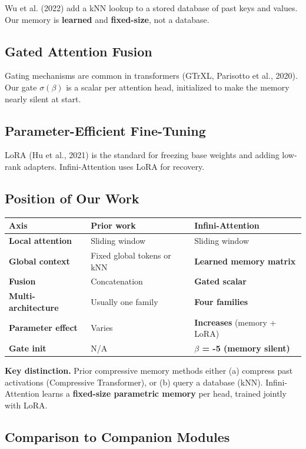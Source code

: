 Wu et al. (2022) add a kNN lookup to a stored database of past keys and 
values. Our memory is \textbf{learned} and \textbf{fixed-size}, not a database.

\subsection{Gated Attention Fusion}

Gating mechanisms are common in transformers (GTrXL, Parisotto et al., 2020). 
Our gate $\sigma(\beta)$ is a scalar per attention head, initialized to make 
the memory nearly silent at start.

\subsection{Parameter-Efficient Fine-Tuning}

LoRA (Hu et al., 2021) is the standard for freezing base weights and adding 
low-rank adapters. Infini-Attention uses LoRA for recovery.

\subsection{Position of Our Work}

\begin{table}[H]
\centering
\small
\begin{tabular}{lll}
\toprule
\textbf{Axis} & \textbf{Prior work} & \textbf{Infini-Attention} \\
\midrule
\textbf{Local attention} & Sliding window & Sliding window \\
\textbf{Global context} & Fixed global tokens or kNN & \textbf{Learned memory matrix} \\
\textbf{Fusion} & Concatenation & \textbf{Gated scalar} \\
\textbf{Multi-architecture} & Usually one family & \textbf{Four families} \\
\textbf{Parameter effect} & Varies & \textbf{Increases} (memory + LoRA) \\
\textbf{Gate init} & N/A & \textbf{$\beta$ = -5 (memory silent)} \\
\bottomrule
\end{tabular}
\end{table}

\textbf{Key distinction.} Prior compressive memory methods either (a) compress 
past activations (Compressive Transformer), or (b) query a database (kNN). 
Infini-Attention learns a \textbf{fixed-size parametric memory} per head, 
trained jointly with LoRA.

\subsection{Comparison to Companion Modules}
